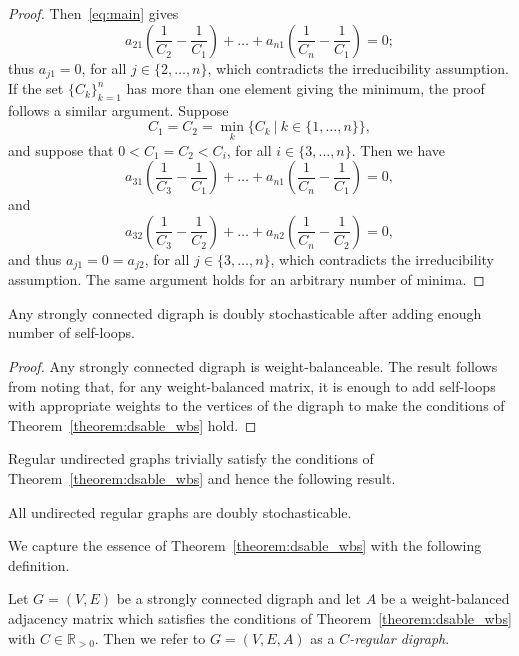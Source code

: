 \documentclass[final]{siamltex}
\begin{document}
\begin{proof}
  
  Then~\eqref{eq:main} gives
  \[
  a_{21}\left(\frac{1}{C_2} - \frac{1}{C_1}\right) + \dots +
  a_{n1}\left(\frac{1}{C_n}-\frac{1}{C_1}\right)=0;
  \]
  thus $ a_{j1}=0 $, for all $ j\in\{2,\dots, n\} $, which contradicts
  the irreducibility assumption. If the set $ \{C_k\}_{k=1}^n $ has
  more than one element giving the minimum, the proof follows a
  similar argument.  Suppose
  \[
  C_1=C_2=\min_{k}\{C_k \ | \ k\in\{1,\ldots, n\}\},
  \]
  and suppose that $ 0<C_1 = C_{2}<C_i $, for all $ i \in\{3,\dots,
  n\}$. Then we have
  \[
  a_{31}\left(\frac{1}{C_3} - \frac{1}{C_1}\right) + \dots +
  a_{n1}\left(\frac{1}{C_n}-\frac{1}{C_1}\right)=0,
  \]  
  and
  \[
  a_{32}\left(\frac{1}{C_3} - \frac{1}{C_2}\right) + \dots +
  a_{n2}\left(\frac{1}{C_n}-\frac{1}{C_2}\right)=0,
  \]  
  and thus $a_{j1}=0=a_{j2}$, for all $j \in \{3, \dots,n \}$, which
  contradicts the irreducibility assumption. The same argument holds
  for an arbitrary number of minima.
\end{proof}

\begin{corollary}\label{corollary:3_adding_loop}
  Any strongly connected digraph is doubly stochasticable after adding
  enough number of self-loops.
\end{corollary}
\begin{proof}
  Any strongly connected digraph is weight-balanceable. The result
  follows from noting that, for any weight-balanced matrix, it is
  enough to add self-loops with appropriate weights to the vertices of
  the digraph to make the conditions of
  Theorem~\ref{theorem:dsable_wbs} hold.
\end{proof}

Regular undirected graphs trivially satisfy the conditions of
Theorem~\ref{theorem:dsable_wbs} and hence the following result.
\begin{corollary}
  All undirected regular graphs are doubly stochasticable.
\end{corollary}

We capture the essence of Theorem~\ref{theorem:dsable_wbs}  with
the following definition. 
\begin{definition}[$ C $-regularity]
  Let $ G=(V,E) $ be a strongly connected digraph and let $ A $ be a
  weight-balanced adjacency matrix which satisfies the conditions of
  Theorem~\ref{theorem:dsable_wbs} with $ C\in \mathbb{R}_{>0} $. Then
  we refer to $ G=(V,E,A) $ as a \emph{$ C $-regular digraph}.
\end{definition}
\end{document}
